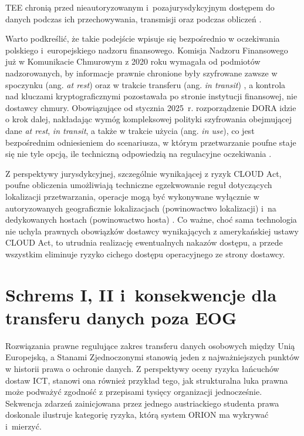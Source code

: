 TEE chronią przed nieautoryzowanym i~pozajurysdykcyjnym dostępem do danych podczas ich przechowywania, transmisji oraz podczas obliczeń \autocite{ijaibdcms2024tee}.

Warto podkreślić, że takie podejście wpisuje się bezpośrednio w oczekiwania polskiego i~europejskiego nadzoru finansowego. Komisja Nadzoru Finansowego już w Komunikacie Chmurowym z 2020 roku wymagała od podmiotów nadzorowanych, by informacje prawnie chronione były szyfrowane zawsze w spoczynku (ang. \textit{at rest}) oraz w trakcie transferu (ang. \textit{in transit}) \autocite{knf2020chmura}, a kontrola nad kluczami
kryptograficznymi pozostawała po stronie instytucji finansowej, nie dostawcy chmury.
Obowiązujące od stycznia 2025~r. rozporządzenie DORA idzie o krok dalej, nakładając wymóg kompleksowej polityki szyfrowania obejmującej dane \textit{at rest}, \textit{in transit}, a także w trakcie użycia (ang. \textit{in use}), co jest bezpośrednim odniesieniem do scenariusza, w którym przetwarzanie poufne staje się nie tyle opcją, ile techniczną odpowiedzią na regulacyjne oczekiwania \autocite{dora2022}\autocite{dora_rts2024}.

Z perspektywy jurysdykcyjnej, szczególnie wynikającej z ryzyk CLOUD Act, poufne obliczenia umożliwiają techniczne egzekwowanie reguł dotyczących lokalizacji przetwarzania, operacje mogą być wykonywane wyłącznie w autoryzowanych geograficznie lokalizacjach ({powinowactwo lokalizacji}) i~na dedykowanych hostach ({powinowactwo hosta}) \autocite{ijaibdcms2024tee}. Co ważne, choć sama technologia nie uchyla prawnych obowiązków dostawcy wynikających z amerykańskiej ustawy CLOUD Act, to utrudnia realizację ewentualnych nakazów dostępu, a przede wszystkim eliminuje ryzyko cichego dostępu
operacyjnego ze strony dostawcy.


\section{Schrems I, II i~konsekwencje dla transferu danych poza EOG}

Rozwiązania prawne regulujące zakres transferu danych osobowych między Unią Europejską, a Stanami Zjednoczonymi stanowią jeden z najważniejszych punktów w historii  prawa o ochronie danych. Z perspektywy oceny ryzyka łańcuchów dostaw ICT, stanowi ona również  przykład tego, jak strukturalna luka prawna może  podważyć zgodność z przepisami tysięcy organizacji jednocześnie. Sekwencja zdarzeń zainicjowana przez jednego austriackiego studenta prawa doskonale ilustruje kategorię ryzyka, którą system ORION ma wykrywać i~mierzyć.

